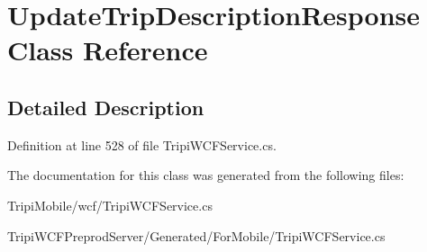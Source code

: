 \hypertarget{class_update_trip_description_response}{
\section{UpdateTripDescriptionResponse Class Reference}
\label{class_update_trip_description_response}
}


\subsection{Detailed Description}


Definition at line 528 of file TripiWCFService.cs.

The documentation for this class was generated from the following files:\begin{DoxyCompactItemize}
\item 
TripiMobile/wcf/TripiWCFService.cs\item 
TripiWCFPreprodServer/Generated/ForMobile/TripiWCFService.cs\end{DoxyCompactItemize}
